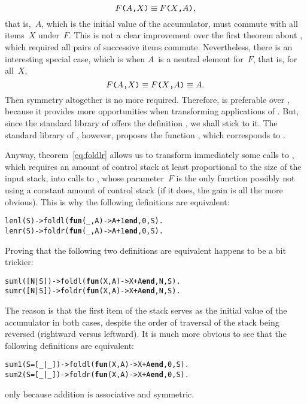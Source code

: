 \begin{equation*}
\texttt{\(F\)(\(A\),\(X\))}
\equiv
\texttt{\(F\)(\(X\),\(A\))},
\end{equation*}
that is,~\(A\), which is the initial value of the accumulator, must
commute with all items~\(X\) under~\(F\). This is not a clear
improvement over the first theorem about , which
required all pairs of successive items commute. Nevertheless, there is
an interesting special case, which is when \(A\)~is a neutral element
for~\(F\), that is, for all~\(X\),
\begin{equation*}
\texttt{\(F\)(\(A\),\(X\))}
\equiv
\texttt{\(F\)(\(X\),\(A\))} \equiv A.
\end{equation*}
Then symmetry altogether is no more required. Therefore,
 is preferable over , because
it provides more opportunities when transforming applications of
. But, since the standard library of \Erlang offers
the definition , we shall stick to it. The standard
library of \OCaml, however, proposes the function
, which corresponds to .

Anyway, theorem~\eqref{eq:foldlr} allows us to transform immediately
some calls to , which requires an amount of control
stack at least proportional to the size of the input stack, into calls
to , whose parameter~\(F\) is the only function
possibly not using a constant amount of control stack (if it does, the
gain is all the more obvious). This is why the following definitions
are equivalent:
\begin{alltt}
lenl(S) -> foldl(\textbf{fun}(\_,A) -> A+1 \textbf{end},0,S).
lenr(S) -> foldr(\textbf{fun}(\_,A) -> A+1 \textbf{end},0,S).
\end{alltt}
Proving that the following two definitions are equivalent happens to
be a bit trickier:
\begin{alltt}
suml([N|S]) -> foldl(\textbf{fun}(X,A) -> X+A \textbf{end},N,S).
sumr([N|S]) -> foldr(\textbf{fun}(X,A) -> X+A \textbf{end},N,S).
\end{alltt}
The reason is that the first item of the stack serves as the initial
value of the accumulator in both cases, despite the order of traversal
of the stack being reversed (rightward versus leftward).  It is much
more obvious to see that the following definitions are equivalent:
\begin{alltt}
sum1(S=[\_|\_]) -> foldl(\textbf{fun}(X,A) -> X+A \textbf{end},0,S).
sum2(S=[\_|\_]) -> foldr(\textbf{fun}(X,A) -> X+A \textbf{end},0,S).
\end{alltt}
only because addition is associative and symmetric.

